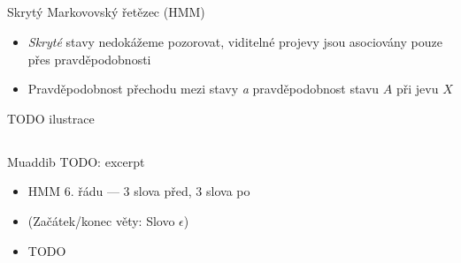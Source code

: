 \documentclass{beamer}
\begin{document}
\subsection{}
\begin{frame}{Skrytý Markovovský řetězec (HMM)}
\begin{itemize}
\item {\em Skryté} stavy nedokážeme pozorovat, viditelné projevy jsou asociovány pouze přes pravděpodobnosti
\item Pravděpodobnost přechodu mezi stavy {\em a} pravděpodobnost stavu $A$ při jevu $X$
\end{itemize}

TODO ilustrace
\end{frame}

\subsection{}
\begin{frame}{Muaddib}
TODO: excerpt

\begin{itemize}
\item HMM 6. řádu --- 3 slova před, 3 slova po
\item (Začátek/konec věty: Slovo $\epsilon$)
\item TODO
\end{itemize}
\end{frame}
\end{document}

